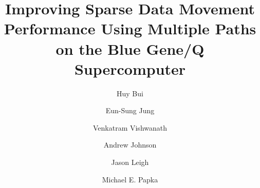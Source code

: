 \documentclass[final,5p,times]{elsarticle}
\begin{document}
\begin{frontmatter}



\title{Improving Sparse Data Movement Performance Using Multiple Paths on the Blue Gene/Q Supercomputer}


\author[evl]{Huy Bui}
\author[mcs]{Eun-Sung Jung}
\author[mcs]{Venkatram Vishwanath}
\author[evl]{Andrew Johnson}
\author[lava]{Jason Leigh}
\author[alcf,niu]{Michael E. Papka}

\address[evl]{Electronic Visualization Laboratory, University of Illinois at Chicago, 842 W. Taylor St., Chicago, IL 60607, USA}
\address[mcs]{Mathematics and Computer Science, Argonne National Laboratory, 9700 S. Cass Ave., Argonne, IL 60439, USA}
\address[alcf]{Argonne Leadership Computing Facility, Argonne National Laboratory, 9700 S. Cass Ave., Argonne, IL 60439, IL, USA}
\address[lava]{Laboratory for Advanced Visualization \& Applications (LAVA), University of Hawai'i at M{\~a}noa, 1680 East-West Road, Honolulu, HI 96822}
\address[niu]{Northern Illinois University, 300 Normal Road, DeKalb, IL 60115, USA}

\begin{abstract}


\end{abstract}
\end{frontmatter}
\end{document}

